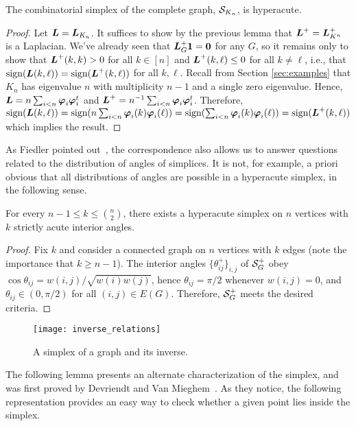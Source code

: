 \begin{corollary}
	The combinatorial simplex of the complete graph,  $\mathcal{S}_{K_n}$, is hyperacute. 
\end{corollary}
\begin{proof}
	Let $\vb*{L}=\vb*{L}_{K_n}$. 
	It suffices to show by the previous lemma that $\vb*{L}^+=\vb*{L}_{K^n}^+$ is a Laplacian. We've already seen that $\vb*{L}_G^+\vb{1}=\vb{0}$ for any $G$, so it remains only to show that $\vb*{L}^+(k,k)>0$ for all $k\in[n]$ and $\vb*{L}^+(k,\ell)\leq 0$ for all $k\neq\ell$, i.e., that $\textnormal{sign}(\vb*{L}(k,\ell))=\textnormal{sign}(\vb*{L}^+(k,\ell))$ for all $k,\ell$. Recall from Section \ref{sec:examples} that $K_n$ has eigenvalue $n$ with multiplicity $n-1$ and a single zero eigenvalue. Hence, $\vb*{L}=n\sum_{i<n}\vb*{\varphi}_i\vb*{\varphi}_i^t$ and $\vb*{L}^+=n^{-1}\sum_{i<n}\vb*{\varphi}_i\vb*{\varphi}_i^t$. 
	Therefore, $\textnormal{sign}(\vb*{L}(k,\ell)) = \textnormal{sign}(n\sum_{i<n}\vb*{\varphi}_i(k)\vb*{\varphi}_i(\ell)) = \textnormal{sign}(\sum_{i<n}\vb*{\varphi}_i(k)\vb*{\varphi}_i(\ell)) = \textnormal{sign}(\vb*{L}^+(k,\ell))$ which implies the result. 
\end{proof}


As Fiedler pointed out~\cite{fiedler1993geometric}, the correspondence also allows us to answer questions related to the distribution of angles of simplices. It is not, for example, a priori obvious that all distributions of angles  are possible in a hyperacute simplex, in the following sense. 

\begin{lemma}
	For every $n-1\leq k \leq \binom{n}{2}$, there exists a hyperacute simplex on $n$ vertices with $k$ strictly acute interior angles. 
\end{lemma}
\begin{proof}
	Fix $k$ and consider a connected graph on $n$ vertices with $k$ edges (note the importance that $k\geq n-1$). The interior angles $\{\theta_{ij}^+\}_{i,j}$ of $\mathcal{S}_G^+$ obey $\cos\theta_{ij} = w(i,j) / \sqrt{w(i)w(j)}$, hence $\theta_{ij}=\pi/2$ whenever $w(i,j)=0$, and $\theta_{ij}\in(0,\pi/2)$ for all $(i,j)\in E(G)$. Therefore, $\mathcal{S}_G^+$ meets the desired criteria. 
\end{proof}



\begin{figure}
	\centering
	\texttt{[image: inverse\_relations]}
	\caption{A simplex of a graph and its inverse. }
	\label{fig:inverse_relations}
\end{figure}


The following lemma presents an alternate characterization of the simplex, and was first proved by Devriendt  and Van Mieghem~\cite{devriendt2018simplex}. As they notice, the following representation provides an easy way to check whether a given point lies inside the simplex. 

